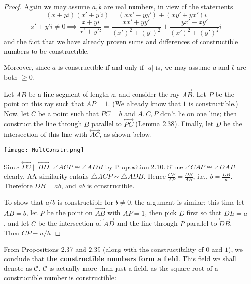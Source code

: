 \documentclass[leqno]{book}
\begin{document}
\begin{proof}
Again we may assume $a,b$ are real numbers, in view of the statements
$$(x+yi)(x'+y'i)=(xx'-yy')+(xy'+yx')i$$
$$x'+y'i\ne 0\implies\frac{x+yi}{x'+y'i}=\frac{xx'+yy'}{(x')^2+(y')^2}+\frac{yx'-xy'}{(x')^2+(y')^2}i$$
and the fact that we have already proven sums and differences of constructible numbers to be constructible.

Moreover, since $a$ is constructible if and only if $|a|$ is, we may assume $a$ and $b$ are both $\geqslant 0$.

Let $\overline{AB}$ be a line segment of length $a$, and consider the ray $\overset{\longrightarrow}{AB}$.  Let $P$ be the point on this ray such that $AP=1$.  (We already know that $1$ is constructible.)  Now, let $C$ be a point such that $PC=b$ and $A,C,P$ don't lie on one line; then construct the line through $B$ parallel to $\overset{\longleftrightarrow}{PC}$ (Lemma 2.38).  Finally, let $D$ be the intersection of this line with $\overset{\longleftrightarrow}{AC}$, as shown below.
\begin{center}\texttt{[image: MultConstr.png]}\end{center}
Since $\overset{\longleftrightarrow}{PC}\parallel\overset{\longleftrightarrow}{BD}$, $\angle ACP\cong\angle ADB$ by Proposition 2.10.  Since $\angle CAP\cong\angle DAB$ clearly, AA similarity entails $\triangle ACP\sim\triangle ADB$.  Hence $\frac{CP}{AP}=\frac{DB}{AB}$, i.e., $b=\frac{DB}a$.  Therefore $DB=ab$, and $ab$ is constructible.

To show that $a/b$ is constructible for $b\ne 0$, the argument is similar; this time let $AB=b$, let $P$ be the point on $\overset{\longrightarrow}{AB}$ with $AP=1$, then pick $D$ first so that $DB=a$, and let $C$ be the intersection of $\overset{\longleftrightarrow}{AD}$ and the line through $P$ parallel to $\overset{\longleftrightarrow}{DB}$.  Then $CP=a/b$.
\end{proof}

\noindent From Propositions 2.37 and 2.39 (along with the constructibility of $0$ and $1$), we conclude that \textbf{the constructible numbers form a field}.  This field we shall denote as $\mathscr C$.  $\mathscr C$ is actually more than just a field, as the square root of a constructible number is constructible:\\
\end{document}
